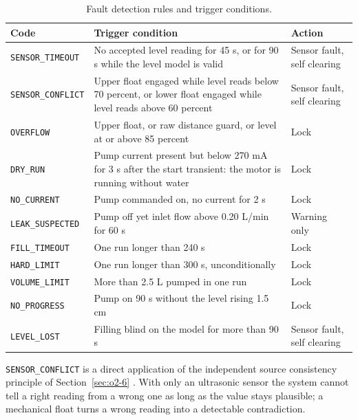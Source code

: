 \begin{table}[H]
\caption{Fault detection rules and trigger conditions.}
\label{tab:luatloi}
\centering
\renewcommand{\arraystretch}{1.08}
\begin{tabular}{|p{3.2cm}|p{6.9cm}|p{2.7cm}|}
\hline
\textbf{Code} & \textbf{Trigger condition} & \textbf{Action} \\
\hline
\texttt{SENSOR\_TIMEOUT} & No accepted level reading for 45 s, or for 90 s while the level model is valid & Sensor fault, self clearing \\
\hline
\texttt{SENSOR\_CONFLICT} & Upper float engaged while level reads below 70 percent, or lower float engaged while level reads above 60 percent & Sensor fault, self clearing \\
\hline
\texttt{OVERFLOW} & Upper float, or raw distance guard, or level at or above 85 percent & Lock \\
\hline
\texttt{DRY\_RUN} & Pump current present but below 270 mA for 3 s after the start transient: the motor is running without water & Lock \\
\hline
\texttt{NO\_CURRENT} & Pump commanded on, no current for 2 s & Lock \\
\hline
\texttt{LEAK\_SUSPECTED} & Pump off yet inlet flow above 0.20 L/min for 60 s & Warning only \\
\hline
\texttt{FILL\_TIMEOUT} & One run longer than 240 s & Lock \\
\hline
\texttt{HARD\_LIMIT} & One run longer than 300 s, unconditionally & Lock \\
\hline
\texttt{VOLUME\_LIMIT} & More than 2.5 L pumped in one run & Lock \\
\hline
\texttt{NO\_PROGRESS} & Pump on 90 s without the level rising 1.5 cm & Lock \\
\hline
\texttt{LEVEL\_LOST} & Filling blind on the model for more than 90 s & Sensor fault, self clearing \\
\hline
\end{tabular}
\end{table}

\texttt{SENSOR\_CONFLICT} is a direct application of the independent source consistency principle of Section~\ref{sec:o2-6} \cite{isermann2006}. With only an ultrasonic sensor the system cannot tell a right reading from a wrong one as long as the value stays plausible; a mechanical float turns a wrong reading into a detectable contradiction.

